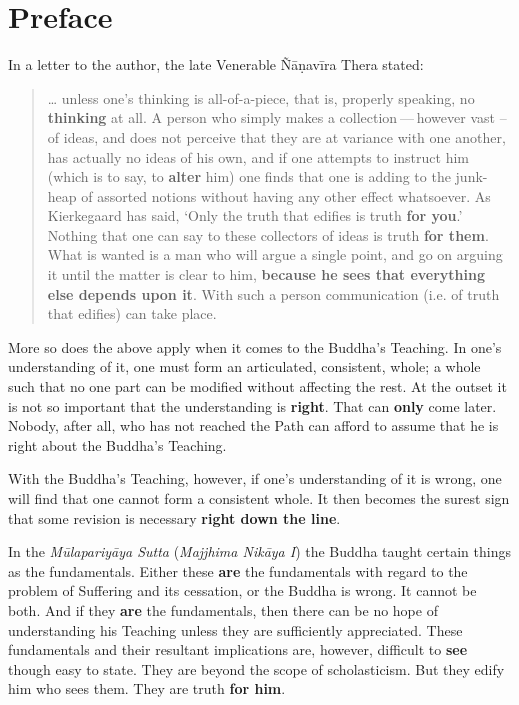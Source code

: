 \chapter{Preface}

In a letter to the author, the late Venerable Ñāṇavīra Thera stated:

\begin{quote}
\ldots{} unless one's thinking is all-of-a-piece, that is, properly speaking, no \textbf{thinking} at all. A person who simply makes a collection --- however vast -- of ideas, and does not perceive that they are at variance with one another, has actually no ideas of his own, and if one attempts to instruct him (which is to say, to \textbf{alter} him) one finds that one is adding to the junk-heap of assorted notions without having any other effect whatsoever. As Kierkegaard has said, `Only the truth that edifies is truth \textbf{for you}.' Nothing that one can say to these collectors of ideas is truth \textbf{for them}. What is wanted is a man who will argue a single point, and go on arguing it until the matter is clear to him, \textbf{because he sees that everything else depends upon it}. With such a person communication (i.e. of truth that edifies) can take place.
\end{quote}

More so does the above apply when it comes to the Buddha's Teaching. In one's understanding of it, one must form an articulated, consistent, whole; a whole such that no one part can be modified without affecting the rest. At the outset it is not so important that the understanding is \textbf{right}. That can \textbf{only} come later. Nobody, after all, who has not reached the Path can afford to assume that he is right about the Buddha's Teaching.

With the Buddha's Teaching, however, if one's understanding of it is wrong, one will find that one cannot form a consistent whole. It then becomes the surest sign that some revision is necessary \textbf{right down the line}.

In the \emph{Mūlapariyāya Sutta} (\emph{Majjhima Nikāya I}) the Buddha taught certain things as the fundamentals. Either these \textbf{are} the fundamentals with regard to the problem of Suffering and its cessation, or the Buddha is wrong. It cannot be both. And if they \textbf{are} the fundamentals, then there can be no hope of understanding his Teaching unless they are sufficiently appreciated. These fundamentals and their resultant implications are, however, difficult to \textbf{see} though easy to state. They are beyond the scope of scholasticism. But they edify him who sees them. They are truth \textbf{for him}.

